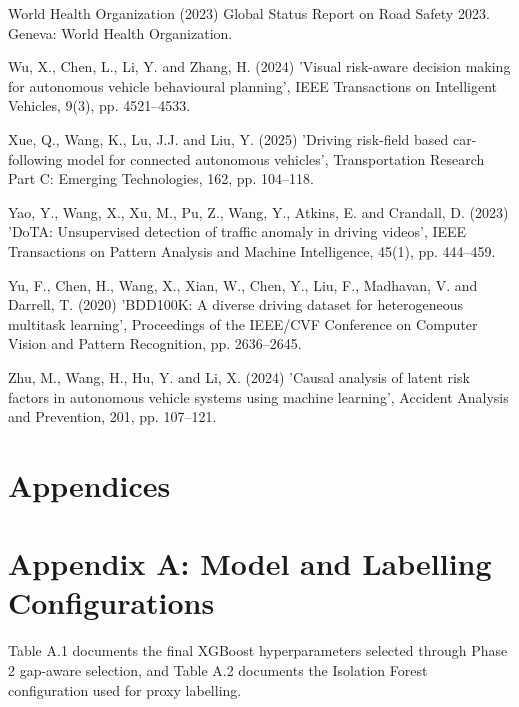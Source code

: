 \documentclass[11pt,a4paper]{article}
\begin{document}
\begin{list}{}{\setlength{\itemindent}{-1.5em}\setlength{\leftmargin}{1.5em}\setlength{\itemsep}{4pt}\setlength{\parsep}{0pt}}
\item World Health Organization (2023) Global Status Report on Road Safety 2023. Geneva: World Health Organization.
\item Wu, X., Chen, L., Li, Y. and Zhang, H. (2024) 'Visual risk-aware decision making for autonomous vehicle behavioural planning', IEEE Transactions on Intelligent Vehicles, 9(3), pp. 4521--4533.
\item Xue, Q., Wang, K., Lu, J.J. and Liu, Y. (2025) 'Driving risk-field based car-following model for connected autonomous vehicles', Transportation Research Part C: Emerging Technologies, 162, pp. 104--118.
\item Yao, Y., Wang, X., Xu, M., Pu, Z., Wang, Y., Atkins, E. and Crandall, D. (2023) 'DoTA: Unsupervised detection of traffic anomaly in driving videos', IEEE Transactions on Pattern Analysis and Machine Intelligence, 45(1), pp. 444--459.
\item Yu, F., Chen, H., Wang, X., Xian, W., Chen, Y., Liu, F., Madhavan, V. and Darrell, T. (2020) 'BDD100K: A diverse driving dataset for heterogeneous multitask learning', Proceedings of the IEEE/CVF Conference on Computer Vision and Pattern Recognition, pp. 2636--2645.
\item Zhu, M., Wang, H., Hu, Y. and Li, X. (2024) 'Causal analysis of latent risk factors in autonomous vehicle systems using machine learning', Accident Analysis and Prevention, 201, pp. 107--121.
\end{list}

\appendix
\section*{Appendices}

\section*{Appendix A: Model and Labelling Configurations}

Table A.1 documents the final XGBoost hyperparameters selected through Phase 2 gap-aware selection, and Table A.2 documents the Isolation Forest configuration used for proxy labelling.
\end{document}
